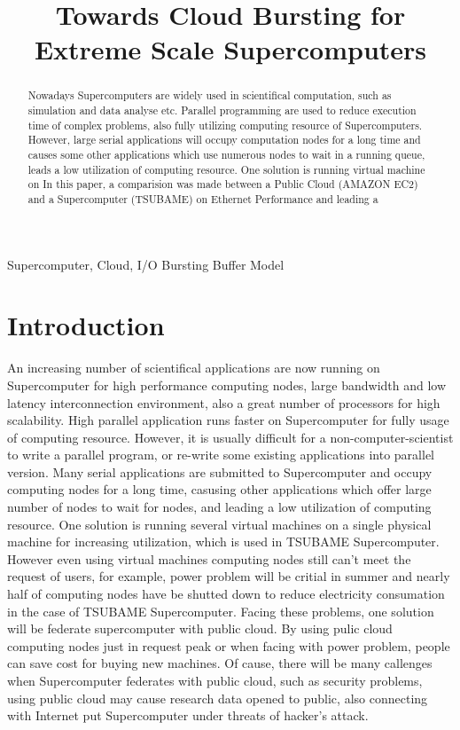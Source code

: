 \documentclass[JIP,draft]{ipsj}
\begin{document}
\title{Towards Cloud Bursting for Extreme Scale Supercomputers}

\begin{abstract}
Nowadays Supercomputers are widely used in scientifical computation, such as simulation and data analyse etc. 
Parallel programming are used to reduce execution time of complex problems, also fully utilizing computing resource of Supercomputers.
However, large serial applications will occupy computation nodes for a long time and causes some other applications which use numerous nodes to wait in a running queue, leads a low utilization of computing resource.
One solution is running virtual machine on 
In this paper, a comparision was made between a Public Cloud (AMAZON EC2) and a Supercomputer (TSUBAME) on Ethernet Performance and leading a 
\end{abstract}

\begin{keyword}
Supercomputer, Cloud, I/O Bursting Buffer Model
\end{keyword}

\maketitle

\section{Introduction}
An increasing number of scientifical applications are now running on Supercomputer for high performance computing nodes, large bandwidth and low latency interconnection environment, also a great number of processors for high scalability.
High parallel application runs faster on Supercomputer for fully usage of computing resource.
However, it is usually difficult for a non-computer-scientist to write a parallel program, or re-write some existing applications into parallel version.
Many serial applications are submitted to Supercomputer and occupy computing nodes for a long time, casusing other applications which offer large number of nodes to wait for nodes, and leading a low utilization of computing resource.
One solution is running several virtual machines on a single physical machine for increasing utilization, which is used in TSUBAME Supercomputer.
However even using virtual machines computing nodes still can't meet the request of users, for example, power problem will be critial in summer and nearly half of computing nodes have be shutted down to reduce electricity consumation in the case of TSUBAME Supercomputer. 
Facing these problems, one solution will be federate supercomputer with public cloud.
By using pulic cloud computing nodes just in request peak or when facing with power problem, people can save cost for buying new machines.
Of cause, there will be many callenges when Supercomputer federates with public cloud, such as security problems, using public cloud may cause research data opened to public, also connecting with Internet put Supercomputer under threats of hacker's attack.
\end{document}

